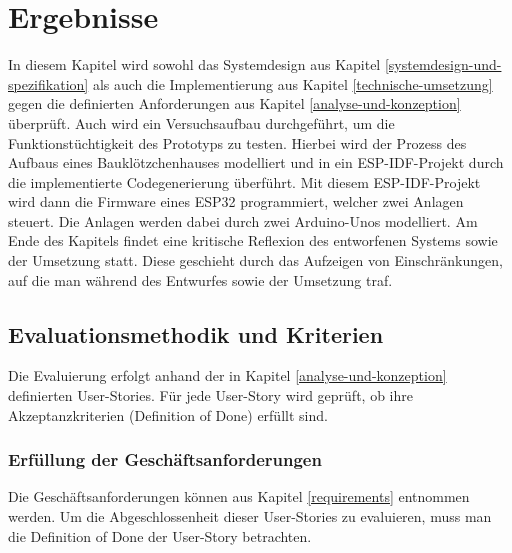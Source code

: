 \chapter{Ergebnisse}
\label{ergebnisse}

In diesem Kapitel wird sowohl das Systemdesign aus Kapitel \ref{systemdesign-und-spezifikation} als auch die Implementierung aus Kapitel \ref{technische-umsetzung} gegen
die definierten Anforderungen aus Kapitel \ref{analyse-und-konzeption} überprüft. Auch wird ein Versuchsaufbau durchgeführt, um die Funktionstüchtigkeit
des Prototyps zu testen. Hierbei wird der Prozess des Aufbaus eines Bauklötzchenhauses modelliert und in ein ESP-IDF-Projekt durch die implementierte Codegenerierung überführt.
Mit diesem ESP-IDF-Projekt wird dann die Firmware eines ESP32 programmiert, welcher zwei Anlagen steuert. Die Anlagen werden dabei durch zwei Arduino-Unos modelliert.
Am Ende des Kapitels findet eine kritische Reflexion des entworfenen Systems sowie der Umsetzung statt. Diese geschieht durch das Aufzeigen von Einschränkungen, auf die man während
des Entwurfes sowie der Umsetzung traf.

\section{Evaluationsmethodik und Kriterien}

Die Evaluierung erfolgt anhand der in Kapitel \ref{analyse-und-konzeption} definierten User-Stories. 
Für jede User-Story wird geprüft, ob ihre Akzeptanzkriterien (Definition of Done) erfüllt sind.

\subsection{Erfüllung der Geschäftsanforderungen}
\label{requirements-check}

Die Geschäftsanforderungen können aus Kapitel \ref{requirements} entnommen werden. Um die Abgeschlossenheit 
dieser User-Stories zu evaluieren, muss man die Definition of Done der User-Story betrachten.

